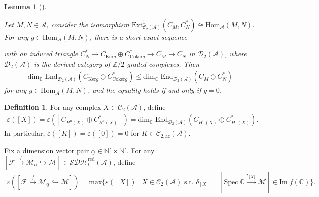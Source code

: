 \documentclass[12pt]{amsart}
\newtheorem{lemma}[theorem]{Lemma}
\theoremstyle{definition}
\newtheorem{definition}[theorem]{Definition}
\numberwithin{equation}{section}
\begin{document}
\begin{lemma}[{\itshape\cite[Theorem 3.25]{LP21}}]\;
\label{Inequality for End}

Let $ M, N \in \mathcal{A} $, consider the isomorphism $ \mathrm{Ext}^1_{\mathcal{C}_2(\mathcal{A})}(C_M,C_N^*) \cong \mathrm{Hom}_{\mathcal{A}}(M, N) $. 
For any $ g \in \mathrm{Hom}_{\mathcal{A}}(M,N) $, there is a short exact sequence  
with an induced triangle $  C_N^* \to C_{\mathrm{Ker}g} \oplus C_{\mathrm{Coker}g}^*  \to C_M \to C_N $ in $ \mathcal{D}_2(\mathcal{A}) $, where $ \mathcal{D}_2(\mathcal{A}) $ is the derived category of $ \mathbb{Z}/2 $-graded complexes. 
Then
    \begin{align*}
        \mathrm{dim}_{\mathbb{C}}\;\mathrm{End}_{\mathcal{D}_2(\mathcal{A})}(C_{\mathrm{Ker}g} \oplus C_{\mathrm{Coker}g}^*) \leqslant \mathrm{dim}_{\mathbb{C}}\;\mathrm{End}_{\mathcal{D}_2(\mathcal{A})}(C_M \oplus C_N^*)
    \end{align*}
    for any $ g \in \mathrm{Hom}_{\mathcal{A}}(M, N) $, and the equality holds if and only if $ g = 0 $.  
\end{lemma} 


\begin{definition}
    \label{Grading of End in C2A}
    For any complex $ X \in \mathcal{C}_2(\mathcal{A}) $, define
     \begin{align*}
        \varepsilon([X]) = \varepsilon([C_{H^0(X)} \oplus C_{H^1(X)}^*]) = \mathrm{dim}_{\mathbb{C}}\;\mathrm{End}_{\mathcal{D}_2(\mathcal{A})}(C_{H^0(X)} \oplus C_{H^1(X)}^*).
    \end{align*}
    In particular, $ \varepsilon([K]) = \varepsilon([0]) = 0 $ for $ K \in \mathcal{C}_{2,\mathrm{ac}}(\mathcal{A}) $.
    
    Fix a dimension vector pair $ \underline{\alpha} \in \mathbb{N}\mathbb{I} \times \mathbb{N}\mathbb{I} $. 
    For any $ [\mathcal{F} \xrightarrow{f} \mathcal{M}_{\underline{\alpha}} \hookrightarrow \mathcal{M}] \in \mathcal{SDH}^{\mathrm{red}}_t(\mathcal{A})$, define
\begin{align*}
    \varepsilon([\mathcal{F} \xrightarrow{f} \mathcal{M}_{\underline{\alpha}} \hookrightarrow \mathcal{M}]) = \mathrm{max} \{\varepsilon([X]) \mid  X \in \mathcal{C}_2(\mathcal{A}) \text{ s.t. }   \delta_{[X]} = [\mathrm{Spec}\;{\mathbb{C}} \xrightarrow{i_{[X]}} \mathcal{M}] \in \mathrm{Im}\;f(\mathbb{C}) \}.
\end{align*}

\end{definition}
\end{document}
